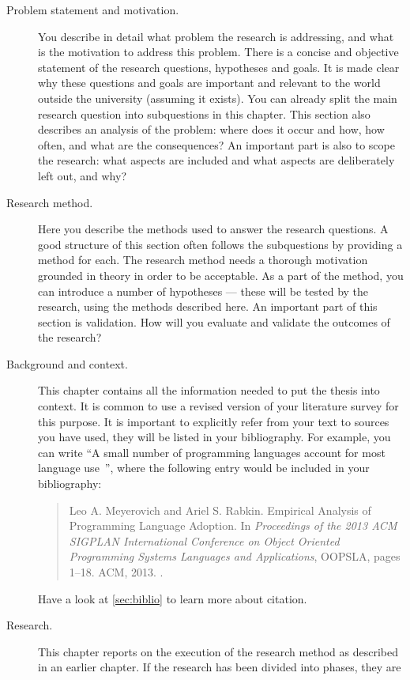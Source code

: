 \documentclass{uvamscse}
\begin{document}
\begin{description}
  \item[Problem statement and motivation.]
  You describe in detail what problem the research is addressing, and what is
the motivation to address this problem. There is a concise and objective
statement of the research questions, hypotheses and goals. It is made clear
why these questions and goals are important and relevant to the world outside
the university (assuming it exists). You can already split the main research
question into subquestions in this chapter. This section also describes an
analysis of the problem: where does it occur and how, how often, and what are
the consequences? An important part is also to scope the research: what
aspects are included and what aspects are deliberately left out, and why?
  \item[Research method.]
  Here you describe the methods used to answer the research questions. A good
structure of this section often follows the subquestions by providing a method
for each. The research method needs a thorough motivation grounded in theory
in order to be acceptable. As a part of the method, you can introduce a number
of hypotheses --- these will be tested by the research, using the methods
described here. An important part of this section is validation. How will you
evaluate and validate the outcomes of the research?
  \item[Background and context.]
  This chapter contains all the information needed to put the thesis into
context. It is common to use a revised version of your literature survey for
this purpose. It is important to explicitly refer from your text to sources
you have used, they will be listed in your bibliography. For example, you can
write ``A small number of programming languages account for most language
use~\cite{MeyerovichR2013}'', where the following entry would be included in
your bibliography:
\begin{quote}
\cite{MeyerovichR2013} Leo A. Meyerovich and Ariel S. Rabkin. Empirical Analysis of Programming Language Adoption. In \emph{Proceedings of the 2013 ACM SIGPLAN International Conference on Object Oriented Programming Systems Languages and Applications}, OOPSLA, pages 1--18. ACM, 2013. .
\end{quote}
Have a look at \autoref{sec:biblio} to learn more about citation.
  \item[Research.]
  This chapter reports on the execution of the research method as described in
an earlier chapter. If the research has been divided into phases, they are

\end{description}
\end{document}
